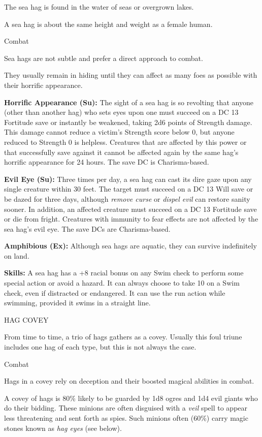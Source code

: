 \documentclass{article}
\begin{document}
The sea hag is found in the water of seas or overgrown lakes.

A sea hag is about the same height and weight as a female human.

Combat

Sea hags are not subtle and prefer a direct approach to combat.

They usually remain in hiding until they can affect as many foes as possible with 
their horrific appearance.

\textbf{Horrific Appearance (Su):} The sight of a sea hag is so revolting that 
anyone (other than another hag) who sets eyes upon one must succeed on a DC 13 
Fortitude save or instantly be weakened, taking 2d6 points of Strength damage. 
This damage cannot reduce a victim's Strength score below 0, but anyone reduced 
to Strength 0 is helpless. Creatures that are affected by this power or that successfully 
save against it cannot be affected again by the same hag's horrific appearance 
for 24 hours. The save DC is Charisma-based.

\textbf{Evil Eye (Su): }Three times per day, a sea hag can cast its dire gaze upon 
any single creature within 30 feet. The target must succeed on a DC 13 Will save 
or be dazed for three days, although \textit{remove curse }or \textit{dispel evil 
}can restore sanity sooner. In addition, an affected creature must succeed on a 
DC 13 Fortitude save or die from fright. Creatures with immunity to fear effects 
are not affected by the sea hag's evil eye. The save DCs are Charisma-based.

\textbf{Amphibious (Ex):} Although sea hags are aquatic, they can survive indefinitely 
on land.

\textbf{Skills:} A sea hag has a +8 racial bonus on any Swim check to perform some 
special action or avoid a hazard. It can always choose to take 10 on a Swim check, 
even if distracted or endangered. It can use the run action while swimming, provided 
it swims in a straight line.

\vspace{12pt}
HAG COVEY

From time to time, a trio of hags gathers as a covey. Usually this foul triune 
includes one hag of each type, but this is not always the case.

Combat

Hags in a covey rely on deception and their boosted magical abilities in combat.

A covey of hags is 80\% likely to be guarded by 1d8 ogres and 1d4 evil giants who 
do their bidding. These minions are often disguised with a \textit{veil }spell 
to appear less threatening and sent forth as spies. Such minions often (60\%) carry 
magic stones known as \textit{hag eyes }(see below).
\end{document}
